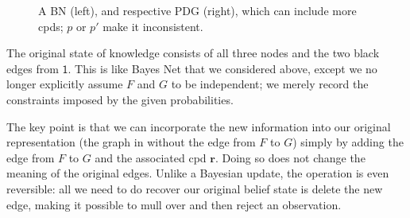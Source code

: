\documentclass{article}
\theoremstyle{plain}
\theoremstyle{definition}
\theoremstyle{remark}
\newcommand\mat[1]{\mathbf{#1}}
\newcommand{\var}[1]{\mathsf{#1}}
\numberwithin{equation}{section}
\begin{document}
\begin{example}
\begin{figure}[htb]
{
	}
    \caption{A BN (left), and respective PDG (right), which can include more cpds; $p$ or $p'$ make it inconsistent.}
    \label{fig:gun-floomp-diagram}
\end{figure}

The original state of knowledge consists of all three nodes and the two black
edges from $\var 1$. This is like Bayes Net that we considered above, except we
no longer
explicitly
assume $F$ and $G$ to be independent; we merely record the constraints
imposed by the given probabilities.  
	
The key point is that we can incorporate the new information into our original
representation (the graph in  without the edge from
$F$ to $G$) simply  by adding the edge from $F$ to $G$ and the associated cpd
$\mat r$. Doing so does not change the meaning of the original edges.  
Unlike a Bayesian update, the operation is even reversible: all we need
to do recover our original belief state is delete the new edge, 
making it possible to mull over and then reject an observation.
%
\end{example}
\end{document}
